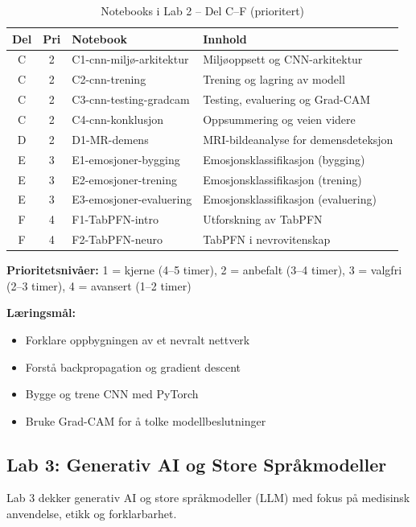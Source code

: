 \documentclass[11pt,a4paper]{article}
\begin{document}
\begin{table}[htbp]
\centering
\caption{Notebooks i Lab 2 -- Del C--F (prioritert)}
\label{tab:lab2cf}
\begin{tabular}{@{}cclp{5.5cm}@{}}
\toprule
\textbf{Del} & \textbf{Pri} & \textbf{Notebook} & \textbf{Innhold} \\
\midrule
C & 2 & C1-cnn-miljø-arkitektur & Miljøoppsett og CNN-arkitektur \\
C & 2 & C2-cnn-trening & Trening og lagring av modell \\
C & 2 & C3-cnn-testing-gradcam & Testing, evaluering og Grad-CAM \\
C & 2 & C4-cnn-konklusjon & Oppsummering og veien videre \\
\midrule
D & 2 & D1-MR-demens & MRI-bildeanalyse for demensdeteksjon \\
\midrule
E & 3 & E1-emosjoner-bygging & Emosjonsklassifikasjon (bygging) \\
E & 3 & E2-emosjoner-trening & Emosjonsklassifikasjon (trening) \\
E & 3 & E3-emosjoner-evaluering & Emosjonsklassifikasjon (evaluering) \\
\midrule
F & 4 & F1-TabPFN-intro & Utforskning av TabPFN \\
F & 4 & F2-TabPFN-neuro & TabPFN i nevrovitenskap \\
\bottomrule
\end{tabular}
\end{table}

\textbf{Prioritetsnivåer:} 1 = kjerne (4--5 timer), 2 = anbefalt (3--4 timer), 3 = valgfri (2--3 timer), 4 = avansert (1--2 timer)

\textbf{Læringsmål:}
\begin{itemize}[nosep]
    \item Forklare oppbygningen av et nevralt nettverk
    \item Forstå backpropagation og gradient descent
    \item Bygge og trene CNN med PyTorch
    \item Bruke Grad-CAM for å tolke modellbeslutninger
\end{itemize}

\subsection{Lab 3: Generativ AI og Store Språkmodeller}

Lab 3 dekker generativ AI og store språkmodeller (LLM) med fokus på medisinsk anvendelse, etikk og forklarbarhet.
\end{document}
